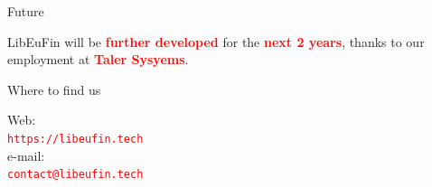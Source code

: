 \documentclass[pdf]{beamer}
\newcommand{\boldred}[1]{\textcolor{red}{\textbf{#1}}}
\begin{document}
\begin{frame}{Future}
  \begin{center}
  LibEuFin will be \boldred{further developed} for the \boldred{next 2 years},
  thanks to our employment at \boldred{Taler Sysyems}.
  \end{center}
\end{frame}

\begin{frame}{Where to find us}
  \begin{center}
  Web: \\ \textcolor{red}{\tt{https://libeufin.tech}} \\
  e-mail: \\ \textcolor{red}{\tt{contact@libeufin.tech}}
  \end{center}
\end{frame}
\end{document}
